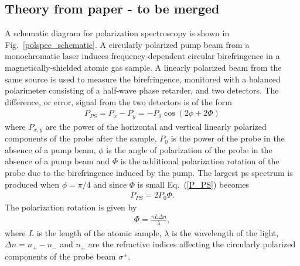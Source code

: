 \subsection{Theory from paper - to be merged}
A schematic diagram for polarization spectroscopy is shown in Fig.~\ref{polspec_schematic}.
A circularly polarized pump beam from a monochromatic laser induces frequency-dependent circular birefringence in a magnetically-shielded atomic gas sample.
A linearly polarized beam from the same source is used to measure the birefringence, monitored with a balanced polarimeter consisting of a half-wave phase retarder,  and two detectors.
The difference, or error, signal from the two detectors is of the form \cite{pearman_polarization_2002}
\begin{align}
P_{PS} = P_x-P_y = -P_0 \cos(2\phi+2\Phi)\label{P_PS}
\end{align}
where $P_{x,y}$ are the power of the horizontal and vertical linearly polarized components of the probe after the sample, $P_0$ is the power of the probe in the absence of a pump beam, $\phi$ is the angle of polarization of the probe in the absence of a pump beam and $\Phi$ is the additional polarization rotation of the probe due to the birefringence induced by the pump.
The largest \gls*{ps} spectrum is produced when $\phi=\pi/4$ and since $\Phi$ is small Eq.~(\ref{P_PS})  becomes
\begin{align}
P_{PS} = 2P_0 \Phi.
\end{align}
The polarization rotation is given by
\begin{align}
\Phi = \frac{\pi L \Delta n}{\lambda},
\end{align}
where $L$ is the length of the atomic sample, $\lambda$ is the wavelength of the light, $\Delta n = n_+ - n_-$ and $n_\pm$ are the refractive indices affecting the circularly polarized components of the probe beam $\sigma^\pm$.
